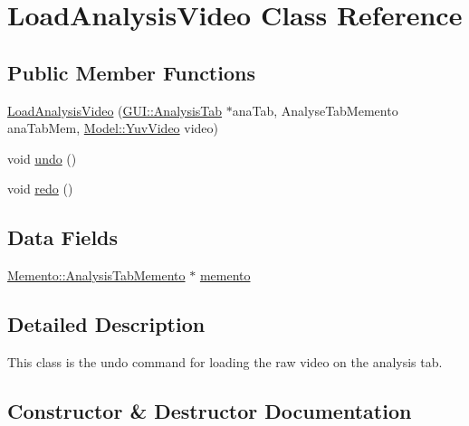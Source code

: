 \hypertarget{classUndoRedo_1_1LoadAnalysisVideo}{}\section{Load\+Analysis\+Video Class Reference}
\label{classUndoRedo_1_1LoadAnalysisVideo}
\subsection*{Public Member Functions}
\begin{DoxyCompactItemize}
\item 
\hyperlink{classUndoRedo_1_1LoadAnalysisVideo_ae34179e8d6121bb4cbe36e1cad9a829f}{Load\+Analysis\+Video} (\hyperlink{classGUI_1_1AnalysisTab}{G\+U\+I\+::\+Analysis\+Tab} $\ast$ana\+Tab, Analyse\+Tab\+Memento ana\+Tab\+Mem, \hyperlink{classModel_1_1YuvVideo}{Model\+::\+Yuv\+Video} video)
\item 
void \hyperlink{classUndoRedo_1_1LoadAnalysisVideo_a0e1e7804a53f6d62efc72c9bdbec8571}{undo} ()
\item 
void \hyperlink{classUndoRedo_1_1LoadAnalysisVideo_a93c48d6ed036e1a381be53ac67643284}{redo} ()
\end{DoxyCompactItemize}
\subsection*{Data Fields}
\begin{DoxyCompactItemize}
\item 
\hyperlink{classMemento_1_1AnalysisTabMemento}{Memento\+::\+Analysis\+Tab\+Memento} $\ast$ \hyperlink{classUndoRedo_1_1LoadAnalysisVideo_a56e13226ed93b1cf23903379eb5d89cb}{memento}
\end{DoxyCompactItemize}


\subsection{Detailed Description}
This class is the undo command for loading the raw video on the analysis tab. 

\subsection{Constructor \& Destructor Documentation}
\hypertarget{classUndoRedo_1_1LoadAnalysisVideo_ae34179e8d6121bb4cbe36e1cad9a829f}{}
